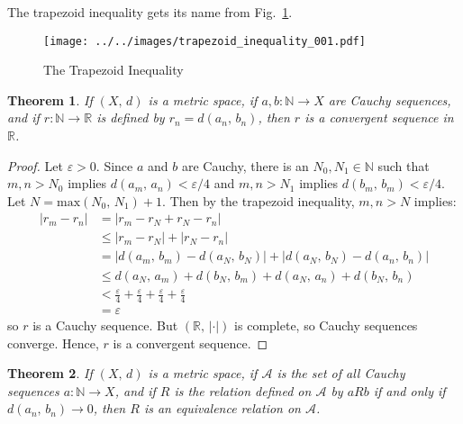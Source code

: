 \documentclass{article}
\theoremstyle{plain}
\newtheorem{theorem}{Theorem}
\theoremstyle{normal}
\begin{document}
    The trapezoid inequality gets its name from
    Fig.~\ref{fig:trapezoid_inequality_001}.
    \begin{figure}
        \centering
        \texttt{[image: ../../images/trapezoid\_inequality\_001.pdf]}
        \caption{The Trapezoid Inequality}
        \label{fig:trapezoid_inequality_001}
    \end{figure}
    \begin{theorem}
        If $(X,\,d)$ is a metric space, if $a,b:\mathbb{N}\rightarrow{X}$ are
        Cauchy sequences, and if $r:\mathbb{N}\rightarrow\mathbb{R}$ is defined
        by $r_{n}=d(a_{n},\,b_{n})$, then $r$ is a convergent sequence in
        $\mathbb{R}$.
    \end{theorem}
    \begin{proof}
        Let $\varepsilon>0$. Since $a$ and $b$ are
        Cauchy, there is an $N_{0},N_{1}\in\mathbb{N}$ such that
        $m,n>N_{0}$ implies $d(a_{m},\,a_{n})<\varepsilon/4$ and
        $m,n>N_{1}$ implies $d(b_{m},\,b_{m})<\varepsilon/4$. Let
        $N=\textrm{max}(N_{0},\,N_{1})+1$. Then by the trapezoid inequality,
        $m,n>N$ implies:
        \begin{align}
            |r_{m}-r_{n}|
            &=|r_{m}-r_{N}+r_{N}-r_{n}|\\
            &\leq|r_{m}-r_{N}|+|r_{N}-r_{n}|\\
            &=|d(a_{m},\,b_{m})-d(a_{N},\,b_{N})|
                +|d(a_{N},\,b_{N})-d(a_{n},\,b_{n})|\\
            &\leq{d}(a_{N},\,a_{m})+d(b_{N},\,b_{m})
                +d(a_{N},\,a_{n})+d(b_{N},\,b_{n})\\
            &<\frac{\varepsilon}{4}+\frac{\varepsilon}{4}
                +\frac{\varepsilon}{4}+\frac{\varepsilon}{4}\\
            &=\varepsilon
        \end{align}
        so $r$ is a Cauchy sequence. But $(\mathbb{R},\,|\cdot|)$ is complete,
        so Cauchy sequences converge. Hence, $r$ is a convergent sequence.
    \end{proof}
    \begin{theorem}
        If $(X,\,d)$ is a metric space, if $\mathcal{A}$ is the set of all
        Cauchy sequences $a:\mathbb{N}\rightarrow{X}$, and if
        $R$ is the relation defined on $\mathcal{A}$ by
        $aRb$ if and only if $d(a_{n},\,b_{n})\rightarrow{0}$, then
        $R$ is an equivalence relation on $\mathcal{A}$.
    \end{theorem}
\end{document}
